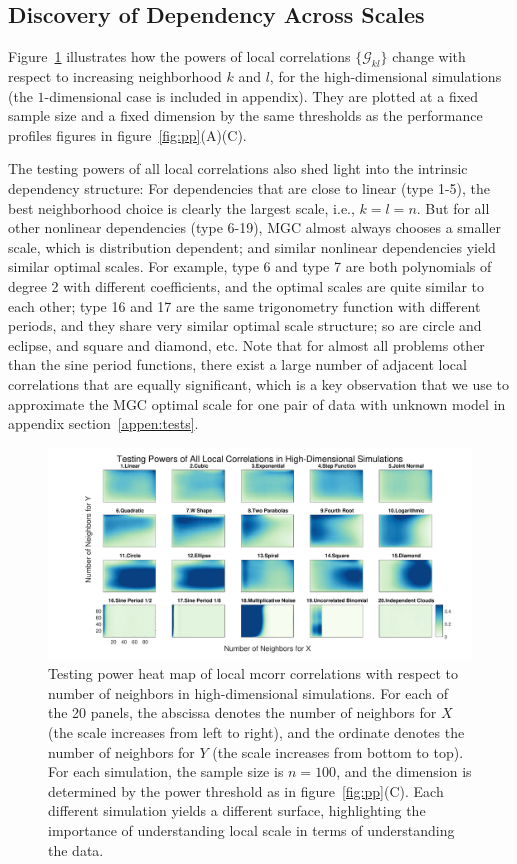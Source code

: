 \documentclass[11pt]{article}
\newcommand{\G}{\mathcal{G}}
\begin{document}
\subsection{Discovery of Dependency Across Scales}
\label{main3}

Figure~\ref{figSim6} illustrates how the powers of local correlations $\{\G_{kl}\}$ change with respect to increasing neighborhood $k$ and $l$, for the high-dimensional simulations (the $1$-dimensional case is included in appendix). They are plotted at a fixed sample size and a fixed dimension by the same thresholds as the performance profiles figures in figure~\ref{fig:pp}(A)(C). 

The testing powers of all local correlations also shed light into the intrinsic dependency structure: For dependencies that are close to linear (type 1-5), the best neighborhood choice is clearly the largest scale, i.e., $k=l=n$. But for all other nonlinear dependencies (type 6-19), MGC almost always chooses a smaller scale, which is distribution dependent; and similar nonlinear dependencies yield similar optimal scales. For example, type 6 and type 7 are both polynomials of degree 2 with different coefficients, and the optimal scales are quite similar to each other; type 16 and 17 are the same trigonometry function with different periods, and they share very similar optimal scale structure; so are circle and eclipse, and square and diamond, etc. Note that for almost all problems other than the sine period functions, there exist a large number of adjacent local correlations that are equally significant, which is a key observation that we use to approximate the MGC optimal scale for one pair of data with unknown model in appendix section~\ref{appen:tests}.

\begin{figure}[htbp]
\includegraphics[width=1.0\textwidth]{Figures/Fig6}
\caption{Testing power heat map of local mcorr correlations with respect to number of neighbors in high-dimensional simulations.
For each of the 20 panels, the abscissa denotes the number of neighbors for $X$ (the scale increases from left to right), and the ordinate denotes the number of neighbors for $Y$ (the scale increases from bottom to top). For each simulation, the sample size is $n=100$, and the dimension is determined by the power threshold as in figure~\ref{fig:pp}(C). Each different simulation yields a different surface, highlighting the importance of understanding local scale in terms of understanding the data. }
\label{figSim6}
\end{figure}
\end{document}
